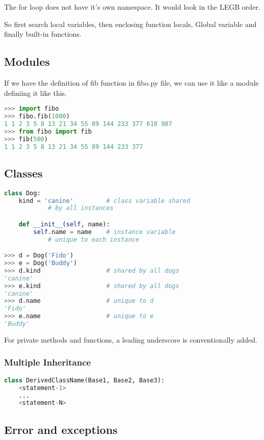 \documentclass[fleqn,10pt]{SelfArx} %
\begin{document}
	The for loop does not have it's own namespace. It would look in the LEGB order.
	
	So first search local variables, then enclosing function locals, Global variable and finally built-in functions.

	\subsection{Modules}
	If we have the definition of fib function in fibo.py file, we can use it like a module definiing it like this.
	\begin{lstlisting}[language=Python, basicstyle=\scriptsize]
>>> import fibo
>>> fibo.fib(1000)
1 1 2 3 5 8 13 21 34 55 89 144 233 377 610 987
>>> from fibo import fib
>>> fib(500)
1 1 2 3 5 8 13 21 34 55 89 144 233 377
	\end{lstlisting}
	
	\subsection{Classes}

	\begin{lstlisting}[language=Python, basicstyle=\scriptsize]
class Dog:
	kind = 'canine'         # class variable shared 
			# by all instances

	def __init__(self, name):
		self.name = name    # instance variable 
			# unique to each instance

>>> d = Dog('Fido')
>>> e = Dog('Buddy')
>>> d.kind                  # shared by all dogs
'canine'
>>> e.kind                  # shared by all dogs
'canine'
>>> d.name                  # unique to d
'Fido'
>>> e.name                  # unique to e
'Buddy'
	\end{lstlisting}
	
	For private methods and functions, a leading underscore is conventionally added. 
	
	\subsubsection{Multiple Inheritance}
	\begin{lstlisting}[language=Python, basicstyle=\scriptsize]
class DerivedClassName(Base1, Base2, Base3):
	<statement-1>
	...
	<statement-N>
	\end{lstlisting}
	
	\subsection{Error and exceptions}
\end{document}
